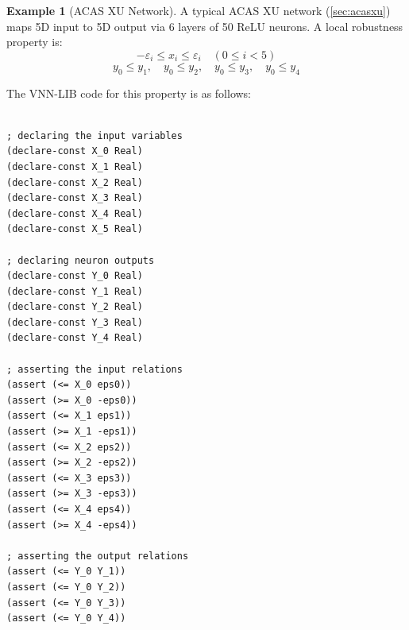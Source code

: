 \documentclass[oneside,11pt,dvipsnames]{book}
\numberwithin{equation}{section}
\theoremstyle{definition}
\newtheorem{example}{Example}[section]
\theoremstyle{remark}
\begin{document}
\begin{example}[ACAS XU Network]

A typical ACAS XU network (\autoref{sec:acasxu}) maps 5D input to 5D output via 6 layers of 50 ReLU neurons. A local robustness property is:
\[
-\varepsilon_i \leq x_i \leq \varepsilon_i \quad (0 \leq i < 5)
\]
\[
y_0 \leq y_1, \quad y_0 \leq y_2, \quad y_0 \leq y_3, \quad y_0 \leq y_4
\]

The VNN-LIB code for this property is as follows:

\begin{lstlisting}[style=SMTLIB-style, language=SMTLIB,basicstyle=\ttfamily\scriptsize]

; declaring the input variables
(declare-const X_0 Real)
(declare-const X_1 Real)
(declare-const X_2 Real)
(declare-const X_3 Real)
(declare-const X_4 Real)
(declare-const X_5 Real)

; declaring neuron outputs
(declare-const Y_0 Real)
(declare-const Y_1 Real)
(declare-const Y_2 Real)
(declare-const Y_3 Real)
(declare-const Y_4 Real)

; asserting the input relations
(assert (<= X_0 eps0))
(assert (>= X_0 -eps0))
(assert (<= X_1 eps1))
(assert (>= X_1 -eps1))
(assert (<= X_2 eps2))
(assert (>= X_2 -eps2))
(assert (<= X_3 eps3))
(assert (>= X_3 -eps3))
(assert (<= X_4 eps4))
(assert (>= X_4 -eps4))

; asserting the output relations
(assert (<= Y_0 Y_1))
(assert (<= Y_0 Y_2))
(assert (<= Y_0 Y_3))
(assert (<= Y_0 Y_4))
\end{lstlisting}
\end{example}




\end{document}
